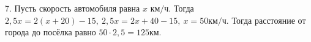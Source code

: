 7. Пусть скорость автомобиля равна $x\text{ км/ч}.$ Тогда $2,5x=2(x+20)-15,\ 2,5x=2x+40-15,\ x=50\text{км/ч}.$ Тогда расстояние от города до посёлка равно $50\cdot2,5=125$км.\\
